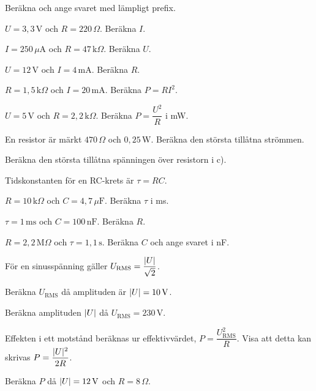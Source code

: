 Beräkna och ange svaret med lämpligt prefix.
\begin{parts}
  \item $U = 3{,}3\,\text{V}$ och $R = 220\,\Omega$. Beräkna $I$.
  \item $I = 250\,\mu\text{A}$ och $R = 47\,\text{k}\Omega$. Beräkna $U$.
  \item $U = 12\,\text{V}$ och $I = 4\,\text{mA}$. Beräkna $R$.
\end{parts}

\begin{parts}
  \item $R = 1{,}5\,\text{k}\Omega$ och $I = 20\,\text{mA}$. Beräkna $P = RI^2$.
  \item $U = 5\,\text{V}$ och $R = 2{,}2\,\text{k}\Omega$. Beräkna $P = \dfrac{U^2}{R}$ i mW.
  \item En resistor är märkt $470\,\Omega$ och $0{,}25\,\text{W}$. Beräkna den största tillåtna
    strömmen.
  \item Beräkna den största tillåtna spänningen över resistorn i c).
\end{parts}

Tidskonstanten för en RC-krets är $\tau = RC$.
\begin{parts}
  \item $R = 10\,\text{k}\Omega$ och $C = 4{,}7\,\mu\text{F}$. Beräkna $\tau$ i ms.
  \item $\tau = 1\,\text{ms}$ och $C = 100\,\text{nF}$. Beräkna $R$.
  \item $R = 2{,}2\,\text{M}\Omega$ och $\tau = 1{,}1\,\text{s}$. Beräkna $C$ och ange svaret i nF.
\end{parts}

För en sinusspänning gäller $U_{\text{RMS}} = \dfrac{\lvert U\rvert}{\sqrt{2}}$.
\begin{parts}
  \item Beräkna $U_{\text{RMS}}$ då amplituden är $\lvert U\rvert = 10\,\text{V}$.
  \item Beräkna amplituden $\lvert U\rvert$ då $U_{\text{RMS}} = 230\,\text{V}$.
  \item Effekten i ett motstånd beräknas ur effektivvärdet, $P = \dfrac{U_{\text{RMS}}^2}{R}$.
    Visa att detta kan skrivas $P = \dfrac{\lvert U\rvert^2}{2R}$.
  \item Beräkna $P$ då $\lvert U\rvert = 12\,\text{V}$ och $R = 8\,\Omega$.
\end{parts}

